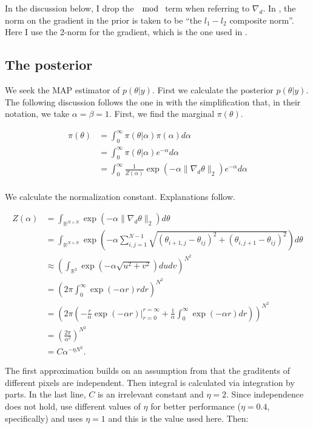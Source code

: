 \documentclass[paper=a4, fontsize=11pt]{scrartcl} %
\numberwithin{equation}{section} %
\numberwithin{figure}{section} %
\numberwithin{table}{section} %
\newcommand{\grad}{\nabla_{d} }
\begin{document}
In the discussion below, I drop the $\mod$ term when referring to
$\grad$. In \cite{green2015bayesian}, the norm on the gradient in the
prior is taken to be ``the $l_1-l_2$ composite norm''. Here I use the
2-norm for the gradient, which is the one used in
\cite{chambolle2004algorithm, oliveira2009adaptive}.

\subsection{The posterior}
We seek the MAP estimator of $p( \theta | y )$. First we calculate the
posterior $p( \theta | y )$.  The following discussion follows the one
in \cite[section 4.1]{oliveira2009adaptive} with the simplification
that, in their notation, we take $\alpha = \beta = 1$. First, we find
the marginal $\pi( \theta )$.

\begin{align*}
  \pi (\theta) &= \int_{0}^{\infty}  \pi(\theta| \alpha ) \pi(\alpha) d\alpha\\
  &= \int_{0}^{\infty}  \pi(\theta| \alpha ) e^{-\alpha} d\alpha \\
  &= \int_{0}^{\infty}  \frac{1}{Z(\alpha)} \exp( -\alpha \|\grad\theta\|_2 ) e^{-\alpha} d\alpha \\
\end{align*}

We calculate the normalization constant. Explanations follow.

\begin{align*}
  Z(\alpha) &= \int_{\mathbb{R}^{N \times N}} \exp( -\alpha \|\grad\theta\|_2 ) d\theta  \\
  &= \int_{\mathbb{R}^{N \times N}} \exp( -\alpha \sum_{i,j=1}^{N-1} \sqrt{ (\theta_{i+1,j} -\theta_{ij})^2 + (\theta_{i,j+1} -\theta_{ij})^2} ) d\theta \\
  &\approx \left (\int_{\mathbb{R}^2}  \exp( -\alpha \sqrt{u^2 + v^2} )dudv \right )^{N^2} \\
  &= \left ( 2\pi \int_0^{\infty} \exp(-\alpha r) rdr \right )^{N^2} \\
  &= \left (2\pi \left (-\frac{r}{\alpha}\exp(-\alpha r) \big
  |_{r=0}^{r=\infty} +\frac{1}{\alpha} \int_0^{\infty}\exp(-\alpha
  r) dr \right ) \right)^{N^2}\\
  &= \left (\frac{2\pi}{\alpha^2} \right )^{N^2} \\
  & = C \alpha^{-\eta N^2}.
\end{align*} 

The first approximation builds on an assumption from
\cite{oliveira2009adaptive} that the graditents of different pixels
are independent. Then integral is calculated via integration by
parts. In the last line, $C$ is an irrelevant constant and $\eta =
2$. Since independence does not hold, \cite{oliveira2009adaptive} use
different values of $\eta$ for better performance ($\eta= 0.4$,
specifically) and \cite{green2015bayesian} uses $\eta = 1$ and this is
the value used here. Then:
\end{document}
